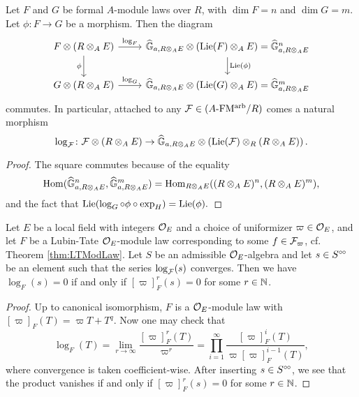 \documentclass[../main.tex]{subfiles}
\begin{document}
\begin{lem}
  Let $F$ and $G$ be formal $A$-module laws over $R$, with $\dim F = n$ and
  $\dim G = m$. 
  Let $\phi\colon  F \to G$ be a morphism. Then the diagram 
  \begin{equation*}
  \begin{tikzcd}[ampersand replacement=\&]
    {F \otimes(R \otimes_A E)} \& {\Ghat_{a, R\otimes_A E} \otimes (\Lie(F)}
    \otimes_A E) =
    \Ghat_{a, R\otimes_AE}^n \\
    {G \otimes(R \otimes_A E)} \& {\Ghat_{a, R\otimes_A E} \otimes (\Lie(G)} \otimes_A E) =
    \Ghat_{a, R\otimes_AE}^m
  	\arrow["{\log_F}", from=1-1, to=1-2]
  	\arrow["\phi"', from=1-1, to=2-1]
  	\arrow["{\Lie(\phi)}", from=1-2, to=2-2]
  	\arrow["{\log_G}", from=2-1, to=2-2]
  \end{tikzcd}
  \end{equation*}
  commutes. In particular, attached to any $\mathcal{F} \in {({A}\text-\allowbreak\mathrm{FM^{arb}}/{R})}$ comes a 
  natural morphism 
  $$\log_{\mathcal{F}}\colon  \mathcal{F} \otimes (R \otimes_A E) \to \widehat{\mathbb{G}}_{a, R\otimes_A E} \otimes
  \left(\operatorname{Lie}(\mathcal{F}) \otimes_R (R \otimes_A E)\right).$$
  \begin{proof}
    The square commutes because of the equality
    $$\operatorname{Hom}(\widehat{\mathbb{G}}_{a, R\otimes_AE}^n, \widehat{\mathbb{G}}_{a, R\otimes_AE}^m) = \operatorname{Hom}_{R \otimes_A E}((R\otimes_A E)^n, (R\otimes_A E)^m),$$
    and the fact that $\operatorname{Lie}(\log_G \circ \phi \circ \exp_H) = \operatorname{Lie}(\phi).$
  \end{proof}
\end{lem}

\begin{lem}\label{lem:KernelOfLog}
  Let $E$ be a local field with integers $\mathcal{O}_E$ and a choice of uniformizer $\varpi \in \mathcal{O}_E$, 
  and let $F$ be a Lubin-Tate $\mathcal{O}_E$-module law corresponding to some 
  $f \in \mathcal{F}_\varpi$, cf. Theorem \ref{thm:LTModLaw}. Let $S$ be an admissible 
  $\mathcal{O}_E$-algebra and let $s \in S^{\circ \hspace{-0.5pt} \circ}$ be an element such that the
  series $\log_{\mathcal{F}}(s)$ 
  converges. Then we have $\log_F(s) = 0$ if and only if $[\varpi]^r_F(s) = 0$ for
  some $r \in \mathbb{N}$. 
\begin{proof}
  Up to canonical isomorphism, $F$ is a $\mathcal{O}_E$-module law with $[\varpi]_F(T) =
  \varpi T + T^q$. Now one may check that 
  \begin{equation*}
    \log_F(T) = \lim_{r \to \infty} \frac{ [\varpi]_F^r(T) }{\varpi^r} = \prod_{i=1}^\infty 
    \frac{[\varpi]^i_F(T)}{\varpi [\varpi]^{i-1}_F(T)},
  \end{equation*}
  where convergence is taken coefficient-wise. After inserting
  $s \in S^{\circ \hspace{-0.5pt} \circ}$, we see that the product vanishes if and only if $[\varpi]_F^r(s) = 0$
  for some $r \in \mathbb{N}$. 
\end{proof}
\end{lem}
\end{document}
